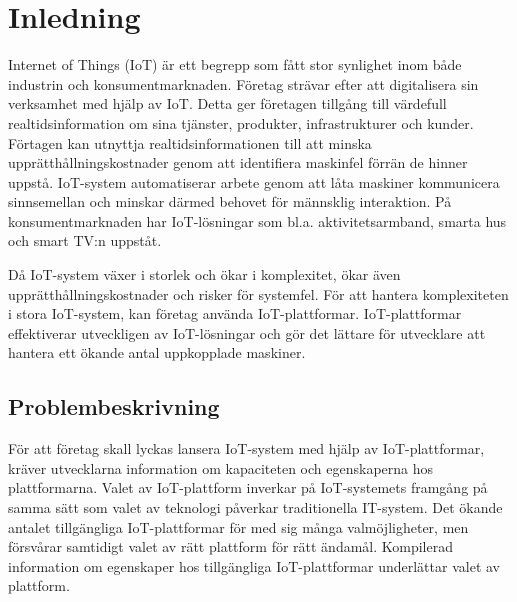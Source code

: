 
\section{Inledning}
Internet of Things (IoT) är ett begrepp som fått stor synlighet inom både
industrin och konsumentmarknaden. Företag strävar efter att digitalisera sin
verksamhet med hjälp av IoT. Detta ger företagen tillgång till värdefull
realtidsinformation om sina tjänster, produkter, infrastrukturer och kunder.
Förtagen kan utnyttja realtidsinformationen till att minska 
upprätthållningskostnader genom att identifiera maskinfel förrän de hinner
uppstå. IoT-system automatiserar arbete genom att låta maskiner kommunicera
sinnsemellan och minskar därmed behovet för männsklig interaktion.
På konsumentmarknaden har IoT-lösningar som bl.a. aktivitetsarmband, smarta hus
och smart TV:n uppståt. 

Då IoT-system växer i storlek och ökar i komplexitet, ökar även 
upprätthållningskostnader och risker för systemfel.
För att hantera komplexiteten i stora IoT-system, kan företag använda
IoT-plattformar. IoT-plattformar effektiverar utveckligen av IoT-lösningar
och gör det lättare för utvecklare att hantera ett ökande antal uppkopplade
maskiner.




\subsection{Problembeskrivning}
För att företag skall lyckas lansera IoT-system med hjälp av IoT-plattformar,
kräver utvecklarna information om kapaciteten och egenskaperna hos 
plattformarna.
Valet av IoT-plattform inverkar på IoT-systemets framgång på samma sätt
som valet av teknologi påverkar traditionella IT-system.
Det ökande antalet tillgängliga IoT-plattformar för med sig många
valmöjligheter, men försvårar samtidigt valet av rätt plattform för rätt
ändamål. Kompilerad information om egenskaper hos tillgängliga IoT-plattformar 
underlättar valet av plattform.


